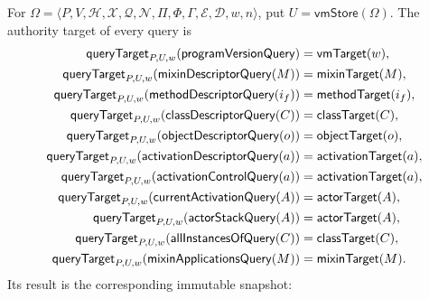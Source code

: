 For $\Omega=\langle P,V,\mathcal H,\mathcal X,\mathcal Q,\mathcal N,
\Pi,\Phi,\Gamma,\mathcal E,\mathcal D,w,n\rangle$, put
$U=\mathsf{vmStore}(\Omega)$.  The authority target of every query is
\begin{equation}\label{eq:mirror-query-target}
\begin{aligned}
 \mathsf{queryTarget}_{P,U,w}(\mathsf{programVersionQuery})
   &=\mathsf{vmTarget}(w),\\
 \mathsf{queryTarget}_{P,U,w}(\mathsf{mixinDescriptorQuery}(M))
   &=\mathsf{mixinTarget}(M),\\
 \mathsf{queryTarget}_{P,U,w}(\mathsf{methodDescriptorQuery}(i_f))
   &=\mathsf{methodTarget}(i_f),\\
 \mathsf{queryTarget}_{P,U,w}(\mathsf{classDescriptorQuery}(C))
   &=\mathsf{classTarget}(C),\\
 \mathsf{queryTarget}_{P,U,w}(\mathsf{objectDescriptorQuery}(o))
   &=\mathsf{objectTarget}(o),\\
 \mathsf{queryTarget}_{P,U,w}(\mathsf{activationDescriptorQuery}(a))
   &=\mathsf{activationTarget}(a),\\
 \mathsf{queryTarget}_{P,U,w}(\mathsf{activationControlQuery}(a))
   &=\mathsf{activationTarget}(a),\\
 \mathsf{queryTarget}_{P,U,w}(\mathsf{currentActivationQuery}(A))
   &=\mathsf{actorTarget}(A),\\
 \mathsf{queryTarget}_{P,U,w}(\mathsf{actorStackQuery}(A))
   &=\mathsf{actorTarget}(A),\\
 \mathsf{queryTarget}_{P,U,w}(\mathsf{allInstancesOfQuery}(C))
   &=\mathsf{classTarget}(C),\\
 \mathsf{queryTarget}_{P,U,w}(\mathsf{mixinApplicationsQuery}(M))
   &=\mathsf{mixinTarget}(M).
\end{aligned}
\end{equation}
Its result is the corresponding immutable snapshot:
